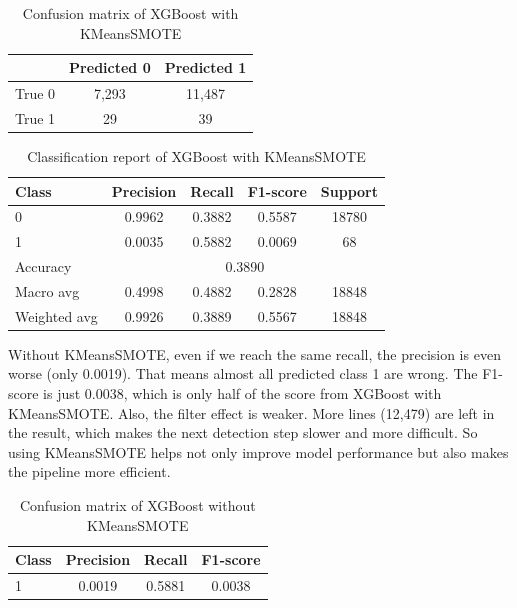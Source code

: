 \begin{table}[H]
    \centering
    \caption{Confusion matrix of XGBoost with KMeansSMOTE}
    \label{tab:xgb-confusion-km}
    \begin{tabular}{lcc}
        \toprule
        & Predicted 0 & Predicted 1 \\
        \midrule
        True 0 & 7,293 & 11,487 \\
        True 1 & 29 & 39 \\
        \bottomrule
    \end{tabular}
\end{table}
\begin{table}[H]
    \centering
    \caption{Classification report of XGBoost with KMeansSMOTE}
    \label{tab:xgb-classification-report-km}
    \begin{tabular}{lcccc}
        \toprule
        Class & Precision & Recall & F1-score & Support \\
        \midrule
        0 & 0.9962 & 0.3882 & 0.5587 & 18780 \\
        1 & 0.0035 & 0.5882 & 0.0069 & 68 \\
        \midrule
        Accuracy & \multicolumn{4}{c}{0.3890} \\
        Macro avg & 0.4998 & 0.4882 & 0.2828 & 18848 \\
        Weighted avg & 0.9926 & 0.3889 & 0.5567 & 18848 \\
        \bottomrule
    \end{tabular}
\end{table}

Without KMeansSMOTE, even if we reach the same recall, the precision is even worse (only 0.0019). That means almost all predicted class 1 are wrong. The F1-score is just 0.0038, which is only half of the score from XGBoost with KMeansSMOTE. Also, the filter effect is weaker. More lines (12,479) are left in the result, which makes the next detection step slower and more difficult. So using KMeansSMOTE helps not only improve model performance but also makes the pipeline more efficient.

\begin{table}[H]
    \centering
    \caption{Confusion matrix of XGBoost without KMeansSMOTE}
    \label{tab:xgb-noKM}
    \begin{tabular}{lccc}
        \toprule
        Class & Precision & Recall & F1-score\\
        \midrule
        1 & 0.0019 & 0.5881 & 0.0038 \\        
        \bottomrule
    \end{tabular}
\end{table}

